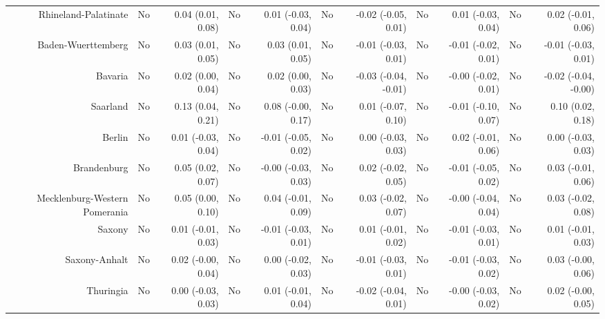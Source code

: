 \documentclass[
  man,floatsintext]{apa6}
\newenvironment{lltable}{\begin{landscape}\centering\begin{ThreePartTable}}{\end{ThreePartTable}\end{landscape}}
\begin{document}
\begin{lltable}
{\begin{longtable}{rrrrrrrrrrr}
Rhineland-Palatinate & No & 0.04 (0.01, 0.08) & No & 0.01 (-0.03, 0.04) & No & -0.02 (-0.05, 0.01) & No & 0.01 (-0.03, 0.04) & No & 0.02 (-0.01, 0.06)\\
Baden-Wuerttemberg & No & 0.03 (0.01, 0.05) & No & 0.03 (0.01, 0.05) & No & -0.01 (-0.03, 0.01) & No & -0.01 (-0.02, 0.01) & No & -0.01 (-0.03, 0.01)\\
Bavaria & No & 0.02 (0.00, 0.04) & No & 0.02 (0.00, 0.03) & No & -0.03 (-0.04, -0.01) & No & -0.00 (-0.02, 0.01) & No & -0.02 (-0.04, -0.00)\\
Saarland & No & 0.13 (0.04, 0.21) & No & 0.08 (-0.00, 0.17) & No & 0.01 (-0.07, 0.10) & No & -0.01 (-0.10, 0.07) & No & 0.10 (0.02, 0.18)\\
Berlin & No & 0.01 (-0.03, 0.04) & No & -0.01 (-0.05, 0.02) & No & 0.00 (-0.03, 0.03) & No & 0.02 (-0.01, 0.06) & No & 0.00 (-0.03, 0.03)\\
Brandenburg & No & 0.05 (0.02, 0.07) & No & -0.00 (-0.03, 0.03) & No & 0.02 (-0.02, 0.05) & No & -0.01 (-0.05, 0.02) & No & 0.03 (-0.01, 0.06)\\
Mecklenburg-Western Pomerania & No & 0.05 (0.00, 0.10) & No & 0.04 (-0.01, 0.09) & No & 0.03 (-0.02, 0.07) & No & -0.00 (-0.04, 0.04) & No & 0.03 (-0.02, 0.08)\\
Saxony & No & 0.01 (-0.01, 0.03) & No & -0.01 (-0.03, 0.01) & No & 0.01 (-0.01, 0.02) & No & -0.01 (-0.03, 0.01) & No & 0.01 (-0.01, 0.03)\\
Saxony-Anhalt & No & 0.02 (-0.00, 0.04) & No & 0.00 (-0.02, 0.03) & No & -0.01 (-0.03, 0.01) & No & -0.01 (-0.03, 0.02) & No & 0.03 (-0.00, 0.06)\\
Thuringia & No & 0.00 (-0.03, 0.03) & No & 0.01 (-0.01, 0.04) & No & -0.02 (-0.04, 0.01) & No & -0.00 (-0.03, 0.02) & No & 0.02 (-0.00, 0.05)\\
\bottomrule
\end{longtable}

}

\end{lltable}
\end{document}

